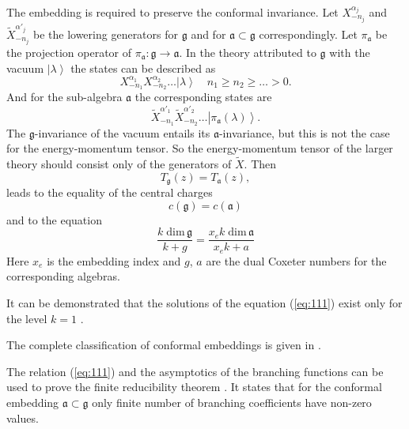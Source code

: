 \documentclass[a4paper,12pt]{article}
\theoremstyle{definition} \newtheorem{Def}{Definition}
\begin{document}
The embedding is required to preserve the conformal invariance.
Let $X^{\alpha_j}_{-n_j}$ and $\tilde{X}^{\alpha'_j}_{-n_j}$ be the lowering generators for $\mathfrak{g}$ and for $\mathfrak{a}\subset\mathfrak{g}$ correspondingly. Let $\pi_{\mathfrak{a}}$ be the projection operator of $\pi_{\mathfrak{a}}:\mathfrak{g}\longrightarrow \mathfrak{a}$. In the theory attributed to $\mathfrak{g}$ with the vacuum $\left|\lambda\right>$ the states can be described as
\begin{equation}
  \label{eq:109}
  X^{\alpha_1}_{-n_1}X^{\alpha_2}_{-n_2}\dots\left|\lambda\right>\quad n_1\geq n_2\geq \dots>0.
\end{equation}
And for the sub-algebra $\mathfrak{a}$ the corresponding states are
\begin{equation}
  \label{eq:110}
  \tilde{X}^{\alpha'_1}_{-n_1}\tilde{X}^{\alpha'_2}_{-n_2}\dots\left|\pi_{\mathfrak{a}}(\lambda)\right>.
\end{equation}
The $\mathfrak{g}$-invariance of the vacuum entails its $\mathfrak{a}$-invariance, but this is not the case for the energy-momentum tensor. So the energy-momentum tensor of the larger theory should consist only of the generators of $\tilde{X}$. Then 
\begin{equation}
  \label{eq:2}
  T_{\mathfrak{g}}(z)=T_{\mathfrak{a}}(z),  
\end{equation}
leads to the equality of the central charges 
\begin{equation}
  \label{eq:33}
  c(\mathfrak{g})=c(\mathfrak{a})
\end{equation}
and to the equation
\begin{equation}
  \label{eq:111}
  \frac{k\;\mathrm{dim}\,\mathfrak{g}}{k+g}=\frac{x_e k\; \mathrm{dim}\,\mathfrak{a}}{x_ek+a}
\end{equation}
Here $x_e$ is the embedding index and $g$, $a$ are the dual Coxeter numbers for the  corresponding algebras.

It can be demonstrated that the solutions of the equation (\ref{eq:111}) exist only
for the level $k=1$ \cite{difrancesco1997cft}.

The complete classification of conformal embeddings is given in \cite{schellekens1986conformal}.

The relation (\ref{eq:111}) and the asymptotics of the branching functions can be used to prove the finite reducibility theorem \cite{kac1988modular}. It states that for the conformal embedding  $\mathfrak{a}\subset\mathfrak{g}$ only finite number of branching coefficients have non-zero values.
\end{document}
